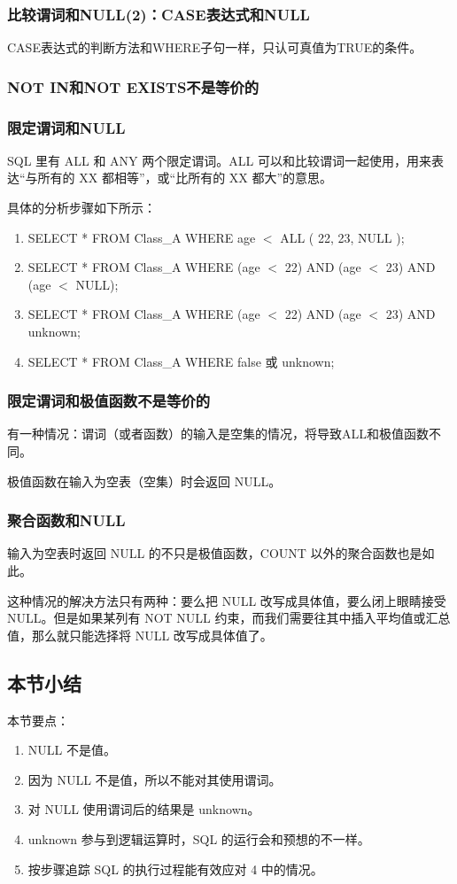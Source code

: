 \subsubsection*{比较谓词和NULL(2)：CASE表达式和NULL}
CASE表达式的判断方法和WHERE子句一样，只认可真值为TRUE的条件。

\subsubsection*{NOT IN和NOT EXISTS不是等价的}

\subsubsection*{限定谓词和NULL}
SQL 里有 ALL 和 ANY 两个限定谓词。ALL 可以和比较谓词一起使用，用来表达“与所有的 XX 都相等”，或“比所有的 XX 都大”的意思。

具体的分析步骤如下所示：
\begin{enumerate}
    \item \textsf{SELECT * FROM Class\_A WHERE age $<$ ALL ( 22, 23, NULL );}
    \item \textsf{SELECT * FROM Class\_A WHERE (age $<$ 22) AND (age $<$ 23) AND (age $<$ NULL);}
    \item \textsf{SELECT * FROM Class\_A WHERE (age $<$ 22) AND (age $<$ 23) AND unknown;}
    \item \textsf{SELECT * FROM Class\_A WHERE false 或 unknown;}
\end{enumerate}
\subsubsection*{限定谓词和极值函数不是等价的}
有一种情况：谓词（或者函数）的输入是空集的情况，将导致ALL和极值函数不同。

极值函数在输入为空表（空集）时会返回 NULL。

\subsubsection*{聚合函数和NULL}
输入为空表时返回 NULL 的不只是极值函数，COUNT 以外的聚合函数也是如此。

这种情况的解决方法只有两种：要么把 NULL 改写成具体值，要么闭上眼睛接受NULL。但是如果某列有 NOT NULL 约束，而我们需要往其中插入平均值或汇总值，那么就只能选择将 NULL 改写成具体值了。
\subsection{本节小结}
本节要点：
\begin{enumerate}
    \item NULL 不是值。
    \item 因为 NULL 不是值，所以不能对其使用谓词。
    \item 对 NULL 使用谓词后的结果是 unknown。
    \item unknown 参与到逻辑运算时，SQL 的运行会和预想的不一样。
    \item 按步骤追踪 SQL 的执行过程能有效应对 4 中的情况。
\end{enumerate}

